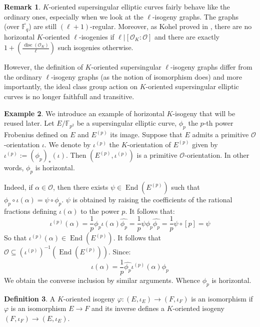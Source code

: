 \documentclass[a4paper,10pt]{report}
\theoremstyle{definition}
\newtheorem{definition}{Definition}[chapter]
\theoremstyle{plain}
\theoremstyle{definition}
\newtheorem{remark}[definition]{Remark}
\newtheorem{example}[definition]{Example}
\newcommand{\F}{\mathbb{F}}
\newcommand{\mO}{\mathcal{O}}
\renewcommand{\(}{\left(}
\renewcommand{\)}{\right)}
\DeclareMathOperator{\End}{End}
\DeclareMathOperator{\disc}{disc}
\begin{document}
\begin{remark}
$K$-oriented supersingular elliptic curves fairly behave like the ordinary ones,  especially when we look at the $\ell$-isogeny graphs.  The graphs (over $\overline{\F_q}$) are still $(\ell+1)$-regular.  Moreover,  as Kohel proved in \cite[proposition 23]{Kohel_thesis},  there are no horizontal $K$-oriented $\ell$-isogenies if $\ell|[\mO_K:\mO]$ and there are exactly $1+\(\frac{\disc(\mO_K)}{\ell}\)$ such isogenies otherwise.

However,  the definition of $K$-oriented supersingular $\ell$-isogeny graphs differ from the ordinary $\ell$-isogeny graphs  (as the notion of isomorphism does) and more importantly,  the ideal class group action on $K$-oriented supersingular elliptic curves is no longer faithfull and transitive.
\end{remark}

\begin{example}
We introduce an example of horizontal $K$-isogeny that will be reused later.  Let $E/\F_{p^2}$ be a supersingular elliptic curve, $\phi_p$ the $p$-th power Frobenius defined on $E$ and $E^{(p)}$ its image. Suppose that $E$ admits a primitive $\mO$-orientation $\iota$.  We denote by $\iota^{(p)}$ the $K$-orientation of $E^{(p)}$ given by $\iota^{(p)}:=(\phi_p)_*(\iota)$.  Then $(E^{(p)},\iota^{(p)})$ is a primitive $\mO$-orientation.  In other words, $\phi_p$ is horizontal.

Indeed, if $\alpha\in\mO$, then there exists $\psi\in\End(E^{(p)})$ such that $\phi_p\circ\iota(\alpha)=\psi\circ\phi_p$. $\psi$ is obtained by raising the coefficients of the rational fractions defining $\iota(\alpha)$ to the power $p$. It follows that:
\[\iota^{(p)}(\alpha)=\frac{1}{p}\phi_p\iota(\alpha)\widehat{\phi_p}=\frac{1}{p}\psi\phi_p\widehat{\phi_p}=\frac{1}{p}\psi\circ[p]=\psi\]
So that $\iota^{(p)}(\alpha)\in\End(E^{(p)})$. It follows that $\mO\subseteq\(\iota^{(p)}\)^{-1}\(\End\(E^{(p)}\)\)$. Since:
\[\iota(\alpha)=\frac{1}{p}\widehat{\phi_p}\iota^{(p)}(\alpha)\phi_p\]
We obtain the converse inclusion by similar arguments.  Whence $\phi_p$ is horizontal.
\end{example}

\begin{definition}
A $K$-oriented isogeny $\varphi : (E, \iota_E)\longrightarrow(F,\iota_F)$ is an isomorphism if $\varphi$ is an isomorphism $E\longrightarrow F$ and its inverse defines a $K$-oriented isogeny $(F, \iota_F)\longrightarrow(E,\iota_E)$.
\end{definition}
\end{document}
